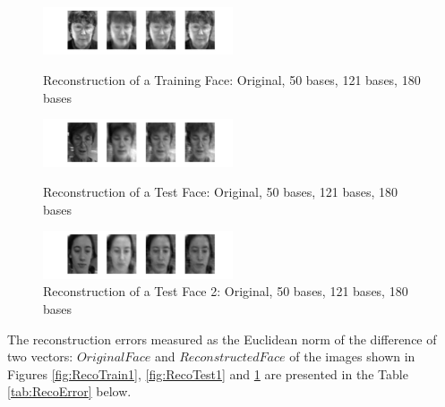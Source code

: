 \documentclass[10pt,twocolumn,letterpaper]{article}
\begin{document}
\begin{figure}[H]
\begin{center}
\includegraphics[width=0.5\textwidth]{../results/Train1_reco}

  \caption{Reconstruction of a Training Face: Original, 50 bases, 121 bases, 180 bases \label{fig:RecoTrain1}}

  \includegraphics[width=0.5\textwidth]{../results/Test1_reco}

  \caption{Reconstruction of a Test Face: Original, 50 bases, 121 bases, 180 bases \label{fig:RecoTest1}}


    \includegraphics[width=0.5\textwidth]{../results/Test2_reco}

  \caption{Reconstruction of a Test Face 2: Original, 50 bases, 121 bases, 180 bases \label{fig:RecoTest2}}

\end{center}
\end{figure}

The reconstruction errors measured as the Euclidean norm of the difference of two vectors: $Original Face$ and $Reconstructed Face$ of the images shown in Figures \ref{fig:RecoTrain1},  \ref{fig:RecoTest1} and \ref{fig:RecoTest2} are presented in the Table \ref{tab:RecoError} below.
\end{document}
